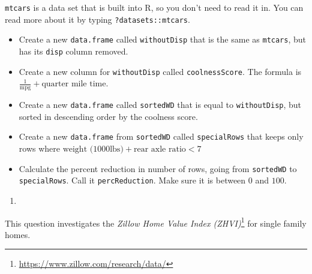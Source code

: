 \documentclass[12pt,krantz2]{krantz}
\providecommand{\tightlist}{%
  \setlength{\itemsep}{0pt}\setlength{\parskip}{0pt}}
\renewcommand{\href}[2]{#2\footnote{\url{#1}}}
\begin{document}
\texttt{mtcars} is a data set that is built into R, so you don't need to read it in. You can read more about it by typing \texttt{?datasets::mtcars}.

\begin{itemize}
\tightlist
\item
  Create a new \texttt{data.frame} called \texttt{withoutDisp} that is the same as \texttt{mtcars}, but has its \texttt{disp} column removed.
\item
  Create a new column for \texttt{withoutDisp} called \texttt{coolnessScore}. The formula is \(\frac{1}{\text{mpg}} + \text{quarter mile time}\).
\item
  Create a new \texttt{data.frame} called \texttt{sortedWD} that is equal to \texttt{withoutDisp}, but sorted in descending order by the coolness score.
\item
  Create a new \texttt{data.frame} from \texttt{sortedWD} called \texttt{specialRows} that keeps only rows where \(\text{weight (1000lbs)} + \text{rear axle ratio} < 7\)
\item
  Calculate the percent reduction in number of rows, going from \texttt{sortedWD} to \texttt{specialRows}. Call it \texttt{percReduction}. Make sure it is between \(0\) and \(100\).
\end{itemize}

\begin{enumerate}
\def\labelenumi{\arabic{enumi}.}
\setcounter{enumi}{2}
\item
\end{enumerate}

This question investigates the \href{https://www.zillow.com/research/data/}{\emph{Zillow Home Value Index (ZHVI)}} for single family homes.
\end{document}

